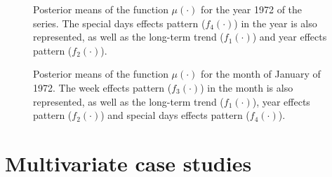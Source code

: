 \documentclass[onecolumn,a4paper,11pt]{article}
\begin{document}
\begin{figure}
\centering
{}
\caption{Posterior means of the function $\mu(\cdot)$ for the year 1972 of the series. The special days effects pattern ($f_4(\cdot)$) in the year is also represented, as well as the long-term trend ($f_1(\cdot)$) and year effects pattern ($f_2(\cdot)$). }
  \label{ch5_fig27_posteriors_oneyear_birthday}
\end{figure}

\begin{figure}
\centering
{}
\caption{Posterior means of the function $\mu(\cdot)$ for the month of January of 1972. The week effects pattern ($f_3(\cdot)$) in the month is also represented, as well as the long-term trend ($f_1(\cdot)$), year effects pattern ($f_2(\cdot)$) and special days effects pattern ($f_4(\cdot)$). }
  \label{ch5_fig27_posteriors_onemonth_birthday}
\end{figure}

 
\section{Multivariate case studies}\label{ch5_sec_multivariate_cases}
\end{document}
